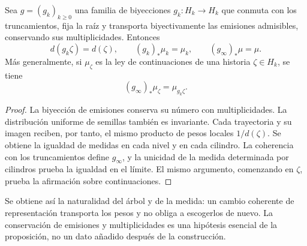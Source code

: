 \begin{proposition}
\label{prop:ch-naturalidad-medida}
Sea \(g=(g_k)_{k\geq0}\) una familia de biyecciones \(g_k:H_k\to H_k\)
que conmuta con los truncamientos, fija la raíz y transporta biyectivamente
las emisiones admisibles, conservando sus multiplicidades. Entonces
\[
 d(g_k\zeta)=d(\zeta),\qquad
 (g_k)_*\mu_k=\mu_k,\qquad (g_\infty)_*\mu=\mu.
\]
Más generalmente, si \(\mu_\zeta\) es la ley de continuaciones de una
historia \(\zeta\in H_k\), se tiene
\[
 (g_\infty)_*\mu_\zeta=\mu_{g_k\zeta}.
\]
\end{proposition}

\begin{proof}
La biyección de emisiones conserva su número con multiplicidades. La
distribución uniforme de semillas también es invariante. Cada trayectoria
y su imagen reciben, por tanto, el mismo producto de pesos locales
\(1/d(\zeta)\). Se obtiene la igualdad de medidas en cada nivel y en
cada cilindro. La coherencia con los truncamientos define \(g_\infty\),
y la unicidad de la medida determinada por cilindros prueba la igualdad
en el límite. El mismo argumento, comenzando en \(\zeta\), prueba la
afirmación sobre continuaciones.
\end{proof}

Se obtiene así la naturalidad del árbol y de la medida: un cambio coherente
de representación transporta los pesos y no obliga a escogerlos de nuevo.
La conservación de emisiones y multiplicidades es una hipótesis esencial de
la proposición, no un dato añadido después de la construcción.

